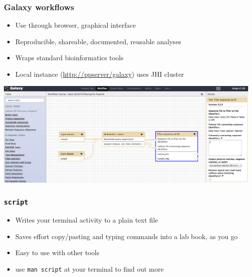 \begin{frame}
  \frametitle{Galaxy workflows}
  \begin{itemize}
    \item Use through browser, graphical interface
    \item Reproducible, shareable, documented, reusable analyses
    \item Wraps standard bioinformatics tools
    \item Local instance (\url{http://ppserver/galaxy}) uses JHI cluster       
  \end{itemize}
  \begin{center}
    \includegraphics[width=.75\textwidth]{images/galaxy_screenshot}
  \end{center}
\end{frame}      
   
\begin{frame}
  \frametitle{\texttt{script}}
  \begin{itemize}
    \item Writes your terminal activity to a plain text file
    \item Saves effort copy/pasting and typing commands into a lab book, as you go
    \item Easy to use with other tools 
    \item use \texttt{man script} at your terminal to find out more
  \end{itemize}
\end{frame}   
   

